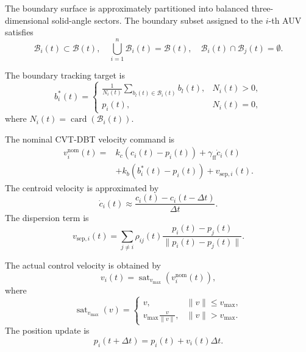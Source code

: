 \documentclass[conference]{IEEEtran}
\begin{document}
The boundary surface is approximately partitioned into balanced three-dimensional solid-angle sectors. The boundary subset assigned to the $i$-th AUV satisfies
\begin{equation}
\mathcal{B}_i(t)\subset\mathcal{B}(t),\quad
\bigcup_{i=1}^{n}\mathcal{B}_i(t)=\mathcal{B}(t),\quad
\mathcal{B}_i(t)\cap\mathcal{B}_j(t)=\emptyset.
\end{equation}

The boundary tracking target is
\begin{equation}
b_i^{\ast}(t)=
\begin{cases}
\frac{1}{N_i(t)}\sum_{b_l(t)\in\mathcal{B}_i(t)}b_l(t), & N_i(t)>0,\\
p_i(t), & N_i(t)=0,
\end{cases}
\end{equation}
where $N_i(t)=\operatorname{card}(\mathcal{B}_i(t))$.

The nominal CVT-DBT velocity command is
\begin{equation}
\begin{aligned}
v_i^{\mathrm{nom}}(t)
={}&k_c(c_i(t)-p_i(t))
+\gamma_{\mathrm{ff}}\dot c_i(t) \\
&+k_b(b_i^{\ast}(t)-p_i(t))
+v_{\mathrm{sep},i}(t).
\end{aligned}
\end{equation}
The centroid velocity is approximated by
\begin{equation}
\dot c_i(t)\approx
\frac{c_i(t)-c_i(t-\Delta t)}{\Delta t}.
\end{equation}
The dispersion term is
\begin{equation}
v_{\mathrm{sep},i}(t)
=
\sum_{j\neq i}
\rho_{ij}(t)
\frac{p_i(t)-p_j(t)}
{\|p_i(t)-p_j(t)\|}.
\end{equation}

The actual control velocity is obtained by
\begin{equation}
v_i(t)=\operatorname{sat}_{v_{\max}}(v_i^{\mathrm{nom}}(t)),
\end{equation}
where
\begin{equation}
\operatorname{sat}_{v_{\max}}(v)=
\begin{cases}
v, & \|v\|\leq v_{\max},\\
v_{\max}\frac{v}{\|v\|}, & \|v\|>v_{\max}.
\end{cases}
\end{equation}
The position update is
\begin{equation}
p_i(t+\Delta t)=p_i(t)+v_i(t)\Delta t.
\end{equation}
\end{document}
